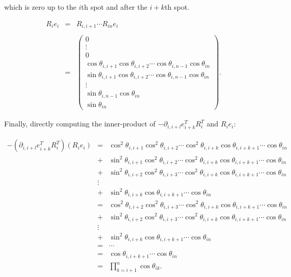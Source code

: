 \documentclass[ba]{imsart}
\numberwithin{equation}{section}
\theoremstyle{plain}
\begin{document}
\noindent which is zero up to the $i$th spot and after the $i+k$th spot.

\begin{eqnarray}
R_i e_i &=&   R_{i,i+1} \cdots R_{in} e_i \\
\\
&=&
\begin{pmatrix}
0\\
\vdots\\
0\\
\cos \theta_{i,i+1} \cos \theta_{i,i+2} \cdots \cos \theta_{i,n-1} \cos \theta_{in}\\
\sin \theta_{i,i+1} \cos \theta_{i,i+2} \cdots \cos \theta_{i,n-1} \cos \theta_{in}\\
\vdots\\
\sin \theta_{i,n-1} \cos \theta_{in}\\
\sin \theta_{in}
\end{pmatrix}.
\end{eqnarray}

\noindent Finally, directly computing the inner-product of $-\partial_{i,i+l} e_{i+k}^T R_i^T$ and $R_i e_i$:

\begin{eqnarray}
-(\partial_{i,i+l} e_{i+k}^T R_i^T) (R_i e_i)
&=&
\cos^2 \theta_{i,i+1} \cos^2 \theta_{i,i+2}  \cdots \cos^2 \theta_{i,i+k}  \cos \theta_{i,i+k+1} \cdots \cos \theta_{in} \nonumber\\
&+& \sin^2 \theta_{i,i+1} \cos^2 \theta_{i,i+2} \cdots \cos^2 \theta_{i,i+k}  \cos \theta_{i,i+k+1} \cdots \cos \theta_{in} \nonumber\\
&+&  \sin^2 \theta_{i,i+2} \cos^2 \theta_{i,i+3} \cdots \cos^2 \theta_{i,i+k}  \cos \theta_{i,i+k+1} \cdots \cos \theta_{in} \nonumber\\
&\vdots&  \nonumber\\
&+&  \sin^2 \theta_{i,i+k} \cos \theta_{i,i+k+1} \cdots \cos \theta_{in}
 \nonumber\\
&=&
\cos^2 \theta_{i,i+2} \cos^2 \theta_{i,i+3}  \cdots \cos^2 \theta_{i,i+k}  \cos \theta_{i,i+k+1} \cdots \cos \theta_{in}  \nonumber\\
&+&  \sin^2 \theta_{i,i+2} \cos^2 \theta_{i,i+3} \cdots \cos^2 \theta_{i,i+k}  \cos \theta_{i,i+k+1} \cdots \cos \theta_{in}  \nonumber\\
&\vdots&  \nonumber\\
&+&  \sin^2 \theta_{i,i+k} \cos \theta_{i,i+k+1} \cdots \cos \theta_{in}  \nonumber\\
&=& \cdots \nonumber\\
&=& \cos \theta_{i,i+k+1} \cdots \cos \theta_{in}\nonumber\\
&=& \prod_{k=i+1}^n \cos \theta_{ik}.
\end{eqnarray}
\end{document}
